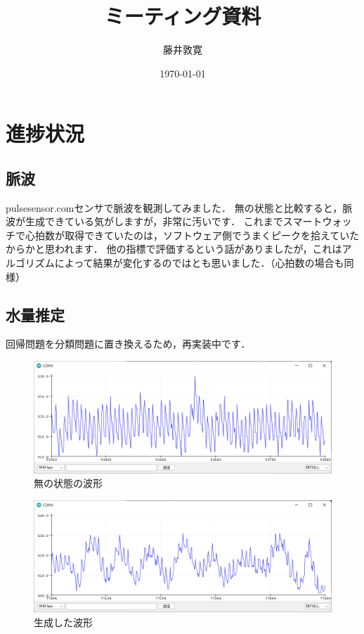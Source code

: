 \documentclass[a4j,10pt]{jarticle}
\title{ミーティング資料}
\author{藤井敦寛}
\date{\today}
\begin{document}
\maketitle

\section{進捗状況}

\subsection{脈波}
pulsesensor.comセンサで脈波を観測してみました．
無の状態と比較すると，脈波が生成できている気がしますが，非常に汚いです．
これまでスマートウォッチで心拍数が取得できていたのは，ソフトウェア側でうまくピークを拾えていたからかと思われます．
他の指標で評価するという話がありましたが，これはアルゴリズムによって結果が変化するのではとも思いました．（心拍数の場合も同様）

\subsection{水量推定}
回帰問題を分類問題に置き換えるため，再実装中です．


\begin{figure}[h]
  \begin{center}
    \includegraphics[width=1\textwidth]{1.png}
    \caption{無の状態の波形}
  \end{center}
\end{figure}

\begin{figure}[h]
  \begin{center}
    \includegraphics[width=1\textwidth]{2.png}
    \caption{生成した波形}
  \end{center}
\end{figure}
\end{document}
